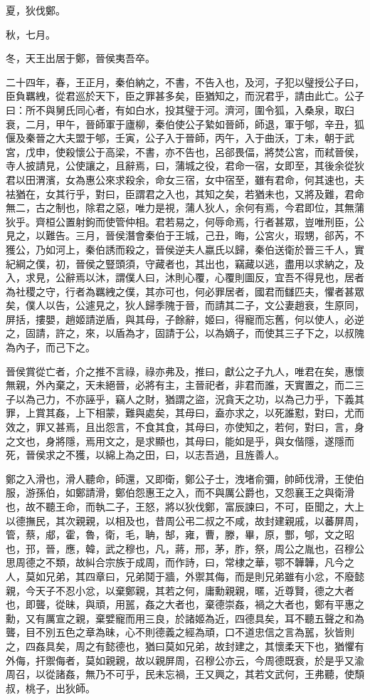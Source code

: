 \begin{pinyinscope}
夏，狄伐鄭。

秋，七月。

冬，天王出居于鄭，晉侯夷吾卒。

二十四年，春，王正月，秦伯納之，不書，不告入也，及河，子犯以璧授公子曰，臣負羈絏，從君巡於天下，臣之罪甚多矣，臣猶知之，而況君乎，請由此亡。公子曰：所不與舅氏同心者，有如白水，投其璧于河。濟河，圍令狐，入桑泉，取臼衰，二月，甲午，晉師軍于廬柳，秦伯使公子縶如晉師，師退，軍于郇，辛丑，狐偃及秦晉之大夫盟于郇，壬寅，公子入于晉師，丙午，入于曲沃，丁未，朝于武宮，戊申，使殺懷公于高梁，不書，亦不告也，呂郤畏偪，將焚公宮，而弒晉侯，寺人披請見，公使讓之，且辭焉，曰，蒲城之役，君命一宿，女即至，其後余從狄君以田渭濱，女為惠公來求殺余，命女三宿，女中宿至，雖有君命，何其速也，夫袪猶在，女其行乎，對曰，臣謂君之入也，其知之矣，若猶未也，又將及難，君命無二，古之制也，除君之惡，唯力是視，蒲人狄人，余何有焉，今君即位，其無蒲狄乎。齊桓公置射鉤而使管仲相。君若易之，何辱命焉，行者甚眾，豈唯刑臣，公見之，以難告。三月，晉侯潛會秦伯于王城，己丑，晦，公宮火，瑕甥，郤芮，不獲公，乃如河上，秦伯誘而殺之，晉侯逆夫人嬴氏以歸，秦伯送衛於晉三千人，實紀綱之僕，初，晉侯之豎頭須，守藏者也，其出也，竊藏以逃，盡用以求納之，及入，求見，公辭焉以沐，謂僕人曰，沐則心覆，心覆則圖反，宜吾不得見也，居者為社稷之守，行者為羈絏之僕，其亦可也，何必罪居者，國君而讎匹夫，懼者甚眾矣，僕人以告，公遽見之，狄人歸季隗于晉，而請其二子，文公妻趙衰，生原同，屏括，摟嬰，趙姬請逆盾，與其母，子餘辭，姬曰，得寵而忘舊，何以使人，必逆之，固請，許之，來，以盾為才，固請于公，以為嫡子，而使其三子下之，以叔隗為內子，而己下之。

晉侯賞從亡者，介之推不言祿，祿亦弗及，推曰，獻公之子九人，唯君在矣，惠懷無親，外內棄之，天未絕晉，必將有主，主晉祀者，非君而誰，天實置之，而二三子以為己力，不亦誣乎，竊人之財，猶謂之盜，況貪天之功，以為己力乎，下義其罪，上賞其姦，上下相蒙，難與處矣，其母曰，盍亦求之，以死誰懟，對曰，尤而效之，罪又甚焉，且出怨言，不食其食，其母曰，亦使知之，若何，對曰，言，身之文也，身將隱，焉用文之，是求顯也，其母曰，能如是乎，與女偕隱，遂隱而死，晉侯求之不獲，以綿上為之田，曰，以志吾過，且旌善人。

鄭之入滑也，滑人聽命，師還，又即衛，鄭公子士，洩堵俞彌，帥師伐滑，王使伯服，游孫伯，如鄭請滑，鄭伯怨惠王之入，而不與厲公爵也，又怨襄王之與衛滑也，故不聽王命，而執二子，王怒，將以狄伐鄭，富辰諫曰，不可，臣聞之，大上以德撫民，其次親親，以相及也，昔周公弔二叔之不咸，故封建親戚，以蕃屏周，管，蔡，郕，霍，魯，衛，毛，聃，郜，雍，曹，滕，畢，原，酆，郇，文之昭也，邘，晉，應，韓，武之穆也，凡，蔣，邢，茅，胙，祭，周公之胤也，召穆公思周德之不類，故糾合宗族于成周，而作詩，曰，常棣之華，鄂不韡韡，凡今之人，莫如兄弟，其四章曰，兄弟鬩于牆，外禦其侮，而是則兄弟雖有小忿，不廢懿親，今天子不忍小忿，以棄鄭親，其若之何，庸勳親親，暱，近尊賢，德之大者也，即聾，從昧，與頑，用嚚，姦之大者也，棄德崇姦，禍之大者也，鄭有平惠之勳，又有厲宣之親，棄嬖寵而用三良，於諸姬為近，四德具矣，耳不聽五聲之和為聾，目不別五色之章為昧，心不則德義之經為頑，口不道忠信之言為嚚，狄皆則之，四姦具矣，周之有懿德也，猶曰莫如兄弟，故封建之，其懷柔天下也，猶懼有外侮，扞禦侮者，莫如親親，故以親屏周，召穆公亦云，今周德既衰，於是乎又渝周召，以從諸姦，無乃不可乎，民未忘禍，王又興之，其若文武何，王弗聽，使頹叔，桃子，出狄師。


\end{pinyinscope}
